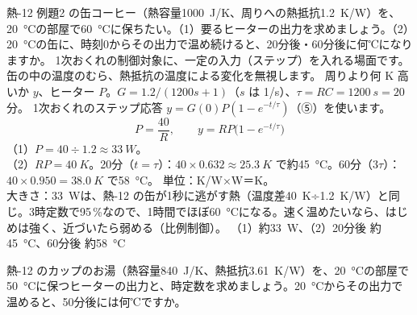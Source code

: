 \label{ph:波-4:ex2}
\begin{phreidai}[缶コーヒーを保温するヒーター]
熱-12 例題2 の缶コーヒー（熱容量\qty{1000}{J/K}、周りへの熱抵抗\qty{1.2}{K/W}）を、\qty{20}{\celsius}の部屋で\qty{60}{\celsius}に保ちたい。（1）要るヒーターの出力を求めましょう。（2）\qty{20}{\celsius}の缶に、時刻0からその出力で温め続けると、20分後・60分後に何℃になりますか。
\phbamen
1次おくれの制御対象に、一定の入力（ステップ）を入れる場面です。
\phmushi
缶の中の温度のむら、熱抵抗の温度による変化を無視します。
\phzu
周りより何 K 高いか $y$、ヒーター $P$。$G=1.2/(1200s+1)$（$s$ は 1/s）、$\tau=RC=\qty{1200}{s}=20$ 分。
\phriyu
1次おくれのステップ応答 $y=G(0)P(1-e^{-t/\tau})$（⑤）を使います。
\phtateru
\[P=\frac{40}{R},\qquad y=RP\bigl(1-e^{-t/\tau}\bigr)\]
\phtoku
（1）$P=40\div1.2\approx\qty{33}{W}$。\\
（2）$RP=\qty{40}{K}$。20分（$t=\tau$）：$40\times0.632\approx\qty{25.3}{K}$ で約\qty{45}{\celsius}。60分（$3\tau$）：$40\times0.950=\qty{38.0}{K}$ で\qty{58}{\celsius}。
\phtashikame
単位：K/W×W＝K。\\
大きさ：\qty{33}{W}は、熱-12 の缶が1秒に逃がす熱（温度差\qty{40}{K}÷\qty{1.2}{K/W}）と同じ。3時定数で95\,\%なので、1時間でほぼ\qty{60}{\celsius}になる。速く温めたいなら、はじめは強く、近づいたら弱める（比例制御）。
\kotae （1）約\qty{33}{W}、（2）20分後 約\qty{45}{\celsius}、60分後 約\qty{58}{\celsius}
\end{phreidai}
\begin{jibun}
熱-12 のカップのお湯（熱容量\qty{840}{J/K}、熱抵抗\qty{3.61}{K/W}）を、\qty{20}{\celsius}の部屋で\qty{50}{\celsius}に保つヒーターの出力と、時定数を求めましょう。\qty{20}{\celsius}からその出力で温めると、50分後には何℃ですか。
\end{jibun}

